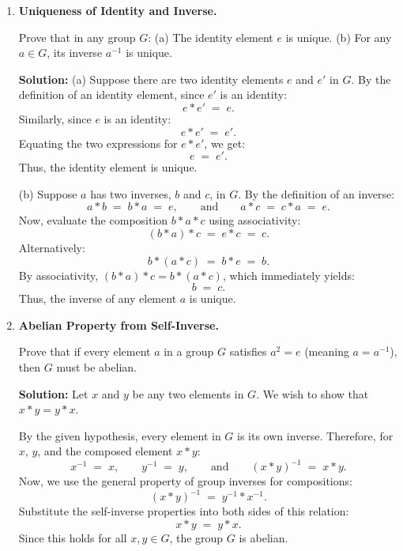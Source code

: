 \documentclass[12pt, a4paper]{article}
\begin{document}
\begin{enumerate}[label=\textbf{E\arabic*.}]
  \item \textbf{Uniqueness of Identity and Inverse.}
  
        Prove that in any group $G$:
        (a) The identity element $e$ is unique.
        (b) For any $a \in G$, its inverse $a^{-1}$ is unique.
        
        \textbf{Solution:}
        (a) Suppose there are two identity elements $e$ and $e'$ in $G$.
        By the definition of an identity element, since $e'$ is an identity:
        \[
          e * e' \;=\; e.
        \]
        Similarly, since $e$ is an identity:
        \[
          e * e' \;=\; e'.
        \]
        Equating the two expressions for $e * e'$, we get:
        \[
          e \;=\; e'.
        \]
        Thus, the identity element is unique.
        
        (b) Suppose $a$ has two inverses, $b$ and $c$, in $G$.
        By the definition of an inverse:
        \[
          a * b \;= \; b * a \;=\; e, \qquad \text{and} \qquad a * c \;=\; c * a \;=\; e.
        \]
        Now, evaluate the composition $b * a * c$ using associativity:
        \[
          (b * a) * c \;=\; e * c \;=\; c.
        \]
        Alternatively:
        \[
          b * (a * c) \;=\; b * e \;=\; b.
        \]
        By associativity, $(b * a) * c = b * (a * c)$, which immediately yields:
        \[
          b \;=\; c.
        \]
        Thus, the inverse of any element $a$ is unique.
        
  \item \textbf{Abelian Property from Self-Inverse.}
  
        Prove that if every element $a$ in a group $G$ satisfies $a^2 = e$ (meaning $a = a^{-1}$), then $G$ must be abelian.
        
        \textbf{Solution:}
        Let $x$ and $y$ be any two elements in $G$.
        We wish to show that $x * y = y * x$.
        
        By the given hypothesis, every element in $G$ is its own inverse.
        Therefore, for $x$, $y$, and the composed element $x * y$:
        \[
          x^{-1} \;=\; x, \qquad y^{-1} \;=\; y, \qquad \text{and} \qquad (x * y)^{-1} \;=\; x * y.
        \]
        Now, we use the general property of group inverses for compositions:
        \[
          (x * y)^{-1} \;=\; y^{-1} * x^{-1}.
        \]
        Substitute the self-inverse properties into both sides of this relation:
        \[
          x * y \;=\; y * x.
        \]
        Since this holds for all $x, y \in G$, the group $G$ is abelian.
\end{enumerate}
\end{document}
